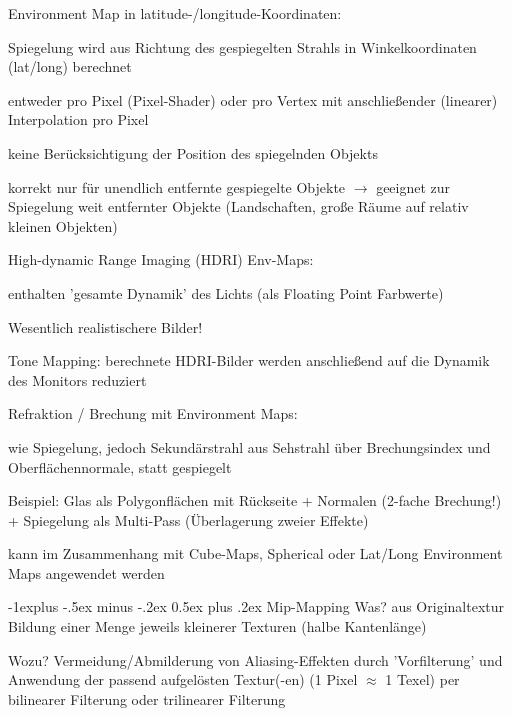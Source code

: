 \documentclass[landscape]{article}
\makeatletter
\renewcommand{\subsection}{\@startsection{subsection}{2}{0mm}%
                                {-1explus -.5ex minus -.2ex}%
                                {0.5ex plus .2ex}%
                                {\normalfont\normalsize\bfseries}}
\makeatother
\begin{document}
\begin{multicols}{3}
  Environment Map in latitude-/longitude-Koordinaten:
  \begin{itemize*}
    \item Spiegelung wird aus Richtung des gespiegelten Strahls in Winkelkoordinaten (lat/long) berechnet
    \item entweder pro Pixel (Pixel-Shader) oder pro Vertex mit anschließender (linearer) Interpolation pro Pixel
    \item keine Berücksichtigung der Position des spiegelnden Objekts
    \item korrekt nur für unendlich entfernte gespiegelte Objekte $\rightarrow$ geeignet zur Spiegelung weit entfernter Objekte (Landschaften, große Räume auf relativ kleinen Objekten)
  \end{itemize*}
  
  
  High-dynamic Range Imaging (HDRI) Env-Maps:
  \begin{itemize*}
    \item enthalten 'gesamte Dynamik' des Lichts (als Floating Point Farbwerte)
    \item Wesentlich realistischere Bilder!
    \item Tone Mapping: berechnete HDRI-Bilder werden anschließend auf die Dynamik des Monitors reduziert
    \item Refraktion / Brechung mit Environment Maps:
    \item wie Spiegelung, jedoch Sekundärstrahl aus Sehstrahl über Brechungsindex und Oberflächennormale, statt gespiegelt
    \item Beispiel: Glas als Polygonflächen mit Rückseite + Normalen (2-fache Brechung!) + Spiegelung als Multi-Pass (Überlagerung zweier Effekte)
    \item kann im Zusammenhang mit Cube-Maps, Spherical oder Lat/Long Environment Maps angewendet werden
  \end{itemize*}
  
  
  \subsection{ Mip-Mapping}
  Was? aus Originaltextur Bildung einer Menge jeweils kleinerer Texturen (halbe Kantenlänge)
  
  Wozu? Vermeidung/Abmilderung von Aliasing-Effekten durch 'Vorfilterung' und Anwendung der passend aufgelösten Textur(-en) (1 Pixel $\approx$ 1 Texel) per bilinearer Filterung oder trilinearer Filterung
  

\end{multicols}
\end{document}
